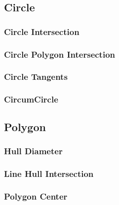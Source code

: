\documentclass[9pt, landscape, a4paper,twosided]{extarticle}
\begin{document}
\begin{multicols*}{3}
\subsection{Circle}
\subsubsection{Circle Intersection}

\subsubsection{Circle Polygon Intersection}

\subsubsection{Circle Tangents}

\subsubsection{CircumCircle}

\subsection{Polygon}
\subsubsection{Hull Diameter}

\subsubsection{Line Hull Intersection}

\subsubsection{Polygon Center}


\end{multicols*}
\end{document}
